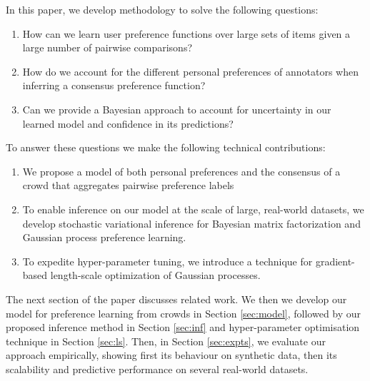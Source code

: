 In this paper, we develop methodology to solve the following questions:
\begin{enumerate}
  \item How can we learn  user preference functions over large sets of items given a large number of pairwise comparisons?
  \item How do we account for the different personal preferences of annotators when inferring a consensus preference function?
  \item Can we provide a Bayesian approach to account for uncertainty in our learned model and confidence in its predictions? 
\end{enumerate}
To answer these questions we make the following technical contributions:
\begin{enumerate}
 \item We propose a model of both personal preferences and the consensus of a crowd 
  that aggregates pairwise preference labels
  \item %
   To enable inference on our model at the scale of large, real-world datasets, we develop
   stochastic variational inference for Bayesian matrix factorization and Gaussian process preference learning.
  \item To expedite hyper-parameter tuning, we introduce a technique for gradient-based length-scale optimization of Gaussian processes.
\end{enumerate}

The next section of the paper discusses related work.
We then we develop our model for preference learning from crowds in Section \ref{sec:model},
followed by our proposed inference method in Section \ref{sec:inf} and
hyper-parameter optimisation technique in Section \ref{sec:ls}.
Then, in Section \ref{sec:expts}, 
we evaluate our approach empirically, showing first its behaviour on synthetic data, 
then its scalability and predictive performance on several real-world datasets.
